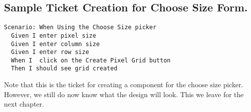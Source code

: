 \subsection{ Sample Ticket Creation for Choose Size Form. }
\begin{verbatim}
Scenario: When Using the Choose Size picker
  Given I enter pixel size
  Given I enter column size
  Given I enter row size
  When I  click on the Create Pixel Grid button
  Then I should see grid created
\end{verbatim}

Note that this is the ticket for creating a component for the choose size picker.
However, we still do now know what the design will look. This we leave for the
next chapter.
